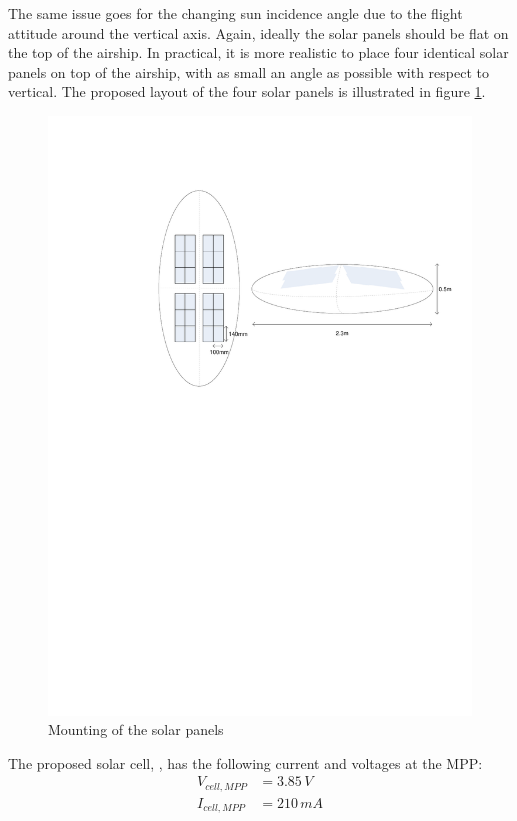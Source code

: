 The same issue goes for the changing sun incidence angle due to the flight attitude around the vertical axis. Again, ideally the solar panels should be flat on the top of the airship. In practical, it is more realistic to place four identical solar panels on top of the airship, with as small an angle as possible with respect to vertical. The proposed layout of the four solar panels is illustrated in figure \ref{fig:solar_panels_mounting}.
%
\begin{figure}[H]
\centering
\includegraphics[scale=0.8]{figures/fig_PDR_Solar_Panels_Mounting}
\caption{Mounting of the solar panels}
\label{fig:solar_panels_mounting}
\end{figure}
%
The proposed solar cell, \cite{MC_Solar_Cell}, has the following current and voltages at the \ac{MPP}:
%
\begin{equation}
\begin{split}
V_{cell,MPP}&=3.85\,V\\
I_{cell,MPP}&=210\,mA
\end{split}
\end{equation}
